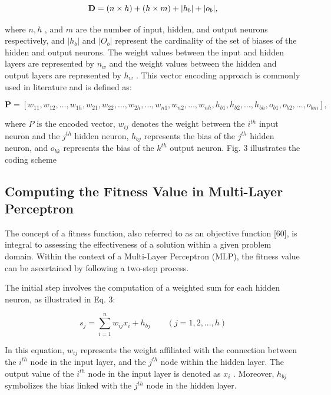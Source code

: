 \begin{equation}
{\bf D}=(n\times h)+(h\times m)+|h_{b}|+|o_{b}|,
\end{equation}

where $n,h$ , and $m$ are the number of input, hidden, and output neurons respectively, and $\left|h_{b}\right|$ and $\left\vert O_{b}\right\vert$ represent the cardinality of the set of biases of the hidden and output neurons. The weight values between the input and hidden layers are represented by $n_{w}$ and the weight values between the hidden and output layers are represented by $h_{w}$ . This vector encoding approach is commonly used in literature and is defined as:

\begin{equation}
\mathbf{P}=[w_{11},w_{12},\dots,w_{1h},w_{21},w_{22},\dots,w_{2h},\dots,w_{n1},w_{n2},\dots,w_{n h},h_{b1},h_{b2},\dots,h_{b h},o_{b1},o_{b2},\dots,o_{b m}],
\end{equation}

where $P$ is the encoded vector, $w_{i j}$ denotes the weight between the $i^{t h}$ input neuron and the $j^{t h}$ hidden neuron, $h_{b j}$ represents the bias of the $j^{t h}$ hidden neuron, and $o_{b k}$ represents the bias of the $k^{t h}$ output neuron. Fig. 3 illustrates the coding scheme

\subsection{Computing the Fitness Value in Multi-Layer Perceptron}

The concept of a fitness function, also referred to as an objective function [60], is integral to assessing the effectiveness of a solution within a given problem domain. Within the context of a Multi-Layer Perceptron (MLP), the fitness value can be ascertained by following a two-step process.

The initial step involves the computation of a weighted sum for each hidden neuron, as illustrated in Eq. 3:

\begin{equation}
s_{j}=\sum_{i=1}^{n}w_{i j}x_{i}+h_{b j}\qquad(j=1,2,...,h)
\end{equation}

In this equation, $w_{i j}$ represents the weight affiliated with the connection between the $i^{t h}$ node in the input layer, and the $j^{t h}$ node within the hidden layer. The output value of the $i^{t h}$ node in the input layer is denoted as $x_{i}$ . Moreover, $h_{b j}$ symbolizes the bias linked with the $j^{t h}$ node in the hidden layer.

